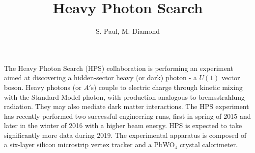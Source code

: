 \documentclass[b1]{sciposter}
\title{Heavy Photon Search}
\author{S. Paul, M. Diamond}
\institute{College of William and Mary, SLAC National Accelerator Laboratory}
\begin{document}
\setlength{\logowidth}{0.15\textheight}
\setlength{\titlewidth}{\textwidth}
\addtolength{\titlewidth}{-2\logowidth}
\maketitle

{The Heavy Photon Search (HPS) collaboration is performing an experiment aimed at discovering a hidden-sector heavy (or dark) photon - a $U(1)$ vector boson. Heavy photons (or $A'$s) couple to electric charge through kinetic mixing with the Standard Model photon, with production analogous to bremsstrahlung radiation. They may also mediate dark matter interactions. The HPS experiment has recently performed two successful engineering runs, first in spring of 2015 and later in the winter of 2016 with a higher beam energy. HPS is expected to take significantly more data during 2019. The experimental apparatus is composed of a six-layer silicon microstrip vertex tracker and a PbWO$_4$ crystal calorimeter. 
}
\end{document}
